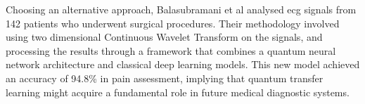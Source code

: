 Choosing an alternative approach, Balasubramani et al \cite{Balasubramani2025} analysed \ac{ecg} signals from 142 patients who underwent surgical procedures. Their methodology involved using two dimensional Continuous Wavelet Transform on the signals, and processing the results through a framework that combines a quantum neural network architecture and classical deep learning models. This new model achieved an accuracy of 94.8\% in pain assessment, implying that quantum transfer learning might acquire a fundamental role in future medical diagnostic systems. 





